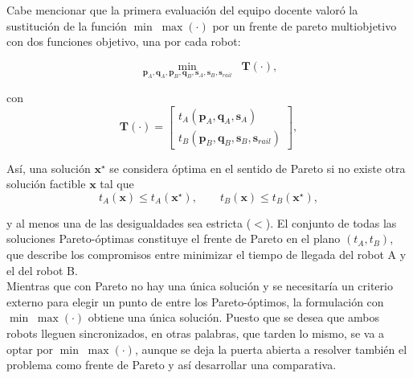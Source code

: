 Cabe mencionar que la primera evaluación del equipo docente valoró la sustitución de la función
$\min\; \max (·)$ por un frente de pareto multiobjetivo con dos funciones objetivo, una por cada robot:

\[
\min_{\mathbf{p}_A,\mathbf{q}_A,\mathbf{p}_B,\mathbf{q}_B,\mathbf{s}_A,\mathbf{s}_B,\mathbf{s}_{rail}}
\;\; \mathbf{T}(\cdot),
\]

con
\[
\mathbf{T}(\cdot) = 
\begin{bmatrix}
t_A(\mathbf{p}_A,\mathbf{q}_A,\mathbf{s}_A) \\
t_B(\mathbf{p}_B,\mathbf{q}_B,\mathbf{s}_B,\mathbf{s}_{rail})
\end{bmatrix},
\]

Así, una solución $\mathbf{x}^\star$ se considera óptima en el sentido de Pareto si no 
existe otra solución factible $\mathbf{x}$ tal que
\[
t_A(\mathbf{x}) \le t_A(\mathbf{x}^\star), \qquad
t_B(\mathbf{x}) \le t_B(\mathbf{x}^\star),
\]

y al menos una de las desigualdades sea estricta ($<$). El conjunto de todas las soluciones 
Pareto-óptimas constituye el frente de Pareto en el plano $(t_A,t_B)$, que describe 
los compromisos entre minimizar el tiempo de llegada del robot A y el del robot B. \\

Mientras que con Pareto no hay una única solución y se necesitaría
un criterio externo para elegir un punto de entre los Pareto-óptimos,
la formulación con $\min\; \max (·)$ obtiene una única solución. Puesto que se 
desea que ambos robots lleguen sincronizados, en otras palabras, que tarden lo mismo, 
se va a optar por $\min\; \max (·)$, aunque se deja la puerta abierta a 
resolver también el problema como frente de Pareto y así desarrollar una comparativa.


